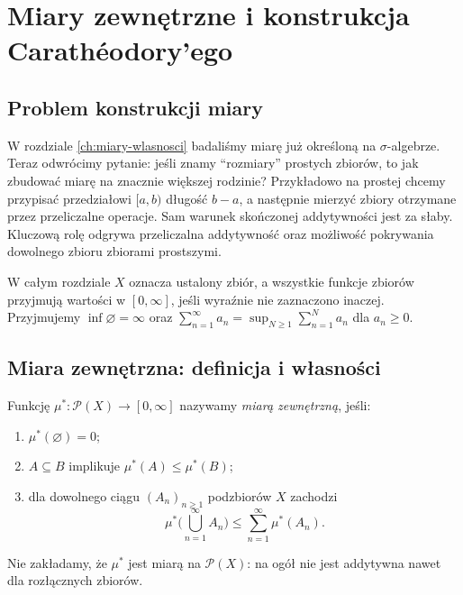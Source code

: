 \chapter{Miary zewnętrzne i konstrukcja Carathéodory'ego}
\label{ch:caratheodory}

\providecommand{\atlasref}[2]{#2}


\section{Problem konstrukcji miary}

W rozdziale \ref{ch:miary-wlasnosci} badaliśmy miarę już określoną na
$\sigma$-algebrze. Teraz odwrócimy pytanie: jeśli znamy ``rozmiary''
prostych zbiorów, to jak zbudować miarę na znacznie większej rodzinie?
Przykładowo na prostej chcemy przypisać przedziałowi $[a,b)$ długość
$b-a$, a następnie mierzyć zbiory otrzymane przez przeliczalne operacje.
Sam warunek skończonej addytywności jest za słaby. Kluczową rolę odgrywa
przeliczalna addytywność oraz możliwość pokrywania dowolnego zbioru
zbiorami prostszymi.

W całym rozdziale $X$ oznacza ustalony zbiór, a wszystkie funkcje
zbiorów przyjmują wartości w $[0,\infty]$, jeśli wyraźnie nie
zaznaczono inaczej. Przyjmujemy $\inf\varnothing=\infty$ oraz
$\sum_{n=1}^\infty a_n=\sup_{N\ge1}\sum_{n=1}^N a_n$ dla $a_n\ge0$.

\section{Miara zewnętrzna: definicja i własności}

\begin{definicja}
\label{def:outer-measure}
Funkcję $\mu^*:\mathcal P(X)\to[0,\infty]$ nazywamy
\emph{miarą zewnętrzną}, jeśli:
\begin{enumerate}[label=\textup{(\roman*)}]
\item $\mu^*(\varnothing)=0$;
\item $A\subseteq B$ implikuje $\mu^*(A)\le\mu^*(B)$;
\item dla dowolnego ciągu $(A_n)_{n\ge1}$ podzbiorów $X$ zachodzi
\begin{equation}\label{eq:outer-subadd}
\mu^*\Big(\bigcup_{n=1}^\infty A_n\Big)
\le\sum_{n=1}^\infty\mu^*(A_n).
\end{equation}
\end{enumerate}
Nie zakładamy, że $\mu^*$ jest miarą na $\mathcal P(X)$:
na ogół nie jest addytywna nawet dla rozłącznych zbiorów.
\end{definicja}


